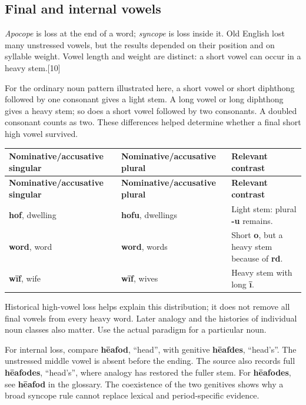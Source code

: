 \subsection*{Final and internal vowels}
\emph{Apocope} is loss at the end of a word; \emph{syncope} is loss inside it. Old English lost many unstressed vowels, but the results depended on their position and on syllable weight. Vowel length and weight are distinct: a short vowel can occur in a heavy stem.[10]\par
For the ordinary noun pattern illustrated here, a short vowel or short diphthong followed by one consonant gives a light stem. A long vowel or long diphthong gives a heavy stem; so does a short vowel followed by two consonants. A doubled consonant counts as two. These differences helped determine whether a final short high vowel survived.\par
\begingroup
\fontsize{10.5}{13.2}\selectfont
\setlength{\LTleft}{0pt}
\setlength{\LTright}{0pt plus 1fil}
\begin{longtable}{@{}>{\raggedright\arraybackslash}p{}>{\raggedright\arraybackslash}p{}>{\raggedright\arraybackslash}p{}@{}}
\toprule
\textbf{Nominative/accusative singular} & \textbf{Nominative/accusative plural} & \textbf{Relevant contrast} \\
\midrule
\endfirsthead
\toprule
\textbf{Nominative/accusative singular} & \textbf{Nominative/accusative plural} & \textbf{Relevant contrast} \\
\midrule
\endhead
\bottomrule
\endfoot
\bottomrule
\endlastfoot
\textbf{hof}, dwelling & \textbf{hofu}, dwellings & Light stem: plural \textbf{-u} remains. \\
\textbf{word}, word & \textbf{word}, words & Short \textbf{o}, but a heavy stem because of \textbf{rd}. \\
\textbf{wīf}, wife & \textbf{wīf}, wives & Heavy stem with long \textbf{ī}. \\
\end{longtable}
\endgroup
Historical high-vowel loss helps explain this distribution; it does not remove all final vowels from every heavy word. Later analogy and the histories of individual noun classes also matter. Use the actual paradigm for a particular noun.\par
For internal loss, compare \textbf{hēafod}, “head”, with genitive \textbf{hēafdes}, “head’s”. The unstressed middle vowel is absent before the ending. The source also records full \textbf{hēafodes}, “head’s”, where analogy has restored the fuller stem. For \textbf{hēafodes}, see \textbf{hēafod} in the glossary. The coexistence of the two genitives shows why a broad syncope rule cannot replace lexical and period-specific evidence.\par
